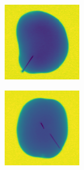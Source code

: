 \documentclass[11pt]{article}
\begin{document}
\begin{figure}[!h]
\begin{subfigure}[b]{0.22\textwidth}
         \caption{}
         \label{fig:metal_5}
     \end{subfigure}
     \hfill
     \begin{subfigure}[b]{0.22\textwidth}
         \centering
         \includegraphics[width=\textwidth]{figurer/potato_dataset/metal/metal_6.jpg}
         \caption{}
         \label{fig:metal_6}
     \end{subfigure}
     \hfill
     \begin{subfigure}[b]{0.22\textwidth}
         \centering
         \includegraphics[width=\textwidth]{figurer/potato_dataset/metal/metal_7.jpg}

\end{subfigure}
\end{figure}
\end{document}
